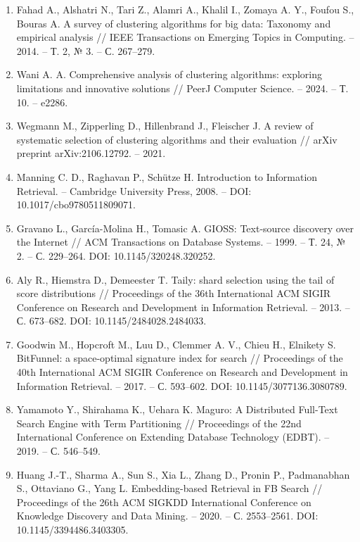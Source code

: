 \documentclass[14pt, a4paper]{article}
\begin{document}
	\begin{enumerate}[wide=0pt, leftmargin=0pt, labelindent=\parindent, listparindent=\parindent, nosep, label=\arabic*]
		\item \hypertarget{src:i1}{} Fahad A., Alshatri N., Tari Z., Alamri A., Khalil I., Zomaya A. Y., Foufou S., Bouras A. A survey of clustering algorithms for big data: Taxonomy and empirical analysis // IEEE Transactions on Emerging Topics in Computing. -- 2014. -- Т. 2, № 3. -- С. 267--279.
		\item \hypertarget{src:i2}{} Wani A. A. Comprehensive analysis of clustering algorithms: exploring limitations and innovative solutions // PeerJ Computer Science. -- 2024. -- Т. 10. -- e2286.
		\item \hypertarget{src:i3}{} Wegmann M., Zipperling D., Hillenbrand J., Fleischer J. A review of systematic selection of clustering algorithms and their evaluation // arXiv preprint arXiv:2106.12792. -- 2021.
		\item \hypertarget{src:i4}{} Manning C. D., Raghavan P., Sch\"utze H. Introduction to Information Retrieval. -- Cambridge University Press, 2008. -- DOI: 10.1017/cbo9780511809071.
		\item \hypertarget{src:i5}{} Gravano L., Garc\'ia-Molina H., Tomasic A. GIOSS: Text-source discovery over the Internet // ACM Transactions on Database Systems. -- 1999. -- Т. 24, № 2. -- С. 229--264. DOI: 10.1145/320248.320252.
		\item \hypertarget{src:i6}{} Aly R., Hiemstra D., Demeester T. Taily: shard selection using the tail of score distributions // Proceedings of the 36th International ACM SIGIR Conference on Research and Development in Information Retrieval. -- 2013. -- С. 673--682. DOI: 10.1145/2484028.2484033.
		\item \hypertarget{src:i7}{} Goodwin M., Hopcroft M., Luu D., Clemmer A. V., Chieu H., Elnikety S. BitFunnel: a space-optimal signature index for search // Proceedings of the 40th International ACM SIGIR Conference on Research and Development in Information Retrieval. -- 2017. -- С. 593--602. DOI: 10.1145/3077136.3080789.
		\item \hypertarget{src:i8}{} Yamamoto Y., Shirahama K., Uehara K. Maguro: A Distributed Full-Text Search Engine with Term Partitioning // Proceedings of the 22nd International Conference on Extending Database Technology (EDBT). -- 2019. -- С. 546--549.
		\item \hypertarget{src:i9}{} Huang J.-T., Sharma A., Sun S., Xia L., Zhang D., Pronin P., Padmanabhan S., Ottaviano G., Yang L. Embedding-based Retrieval in FB Search // Proceedings of the 26th ACM SIGKDD International Conference on Knowledge Discovery and Data Mining. -- 2020. -- С. 2553--2561. DOI: 10.1145/3394486.3403305.

\end{enumerate}
\end{document}

